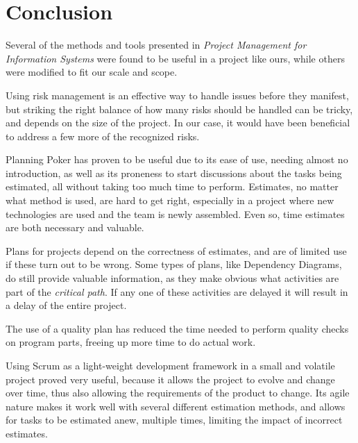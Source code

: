 \section{Conclusion}

Several of the methods and tools presented in \emph{Project Management for
Information Systems}\cite{caye} were found to be useful in a project like ours,
while others were modified to fit our scale and scope.

Using risk management is an effective way to handle issues before they
manifest, but striking the right balance of how many risks should be handled
can be tricky, and depends on the size of the project. In our case, it would
have been beneficial to address a few more of the recognized risks.

Planning Poker has proven to be useful due to its ease of use, needing
almost no introduction, as well as its proneness to start discussions about the
tasks being estimated, all without taking too much time to perform.
Estimates, no matter what method is used, are hard to get right, especially
in a project where new technologies are used and the team is newly assembled.
Even so, time estimates are both necessary and valuable.

Plans for projects depend on the correctness of estimates, and are of limited
use if these turn out to be wrong. Some types of plans, like Dependency Diagrams,
do still provide valuable information, as they make obvious what activities are
part of the \emph{critical path}. If any one of these activities are delayed it
will result in a delay of the entire project.

The use of a quality plan has reduced the time needed to perform quality checks
on program parts, freeing up more time to do actual work.

Using Scrum as a light-weight development framework in a small and volatile
project proved very useful, because it allows the project to evolve and change
over time, thus also allowing the requirements of the product to change. Its
agile nature makes it work well with several different estimation methods, and
allows for tasks to be estimated anew, multiple times, limiting the impact of
incorrect estimates.
